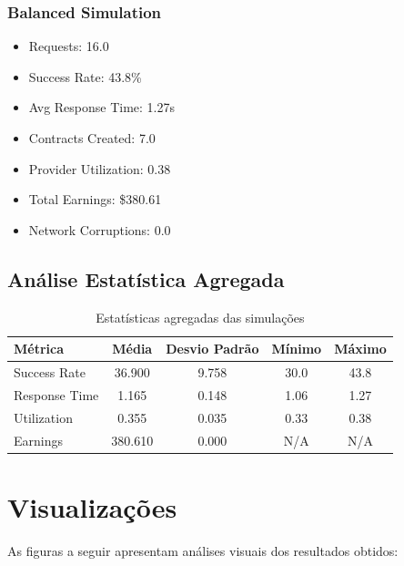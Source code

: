 \documentclass[12pt,a4paper]{article}
\begin{document}
\subsubsection{Balanced Simulation}

\begin{itemize}
    \item Requests: 16.0
    \item Success Rate: 43.8\%
    \item Avg Response Time: 1.27s
    \item Contracts Created: 7.0
    \item Provider Utilization: 0.38
    \item Total Earnings: \$380.61
    \item Network Corruptions: 0.0
\end{itemize}


\subsection{Análise Estatística Agregada}


\begin{table}[H]
\centering
\begin{tabular}{@{}lcccc@{}}
\toprule
Métrica & Média & Desvio Padrão & Mínimo & Máximo \\
\midrule
Success Rate & 36.900 & 9.758 & 30.0 & 43.8 \\
Response Time & 1.165 & 0.148 & 1.06 & 1.27 \\
Utilization & 0.355 & 0.035 & 0.33 & 0.38 \\
Earnings & 380.610 & 0.000 & N/A & N/A \\

\bottomrule
\end{tabular}
\caption{Estatísticas agregadas das simulações}
\label{tab:stats}
\end{table}


\section{Visualizações}

As figuras a seguir apresentam análises visuais dos resultados obtidos:
\end{document}
